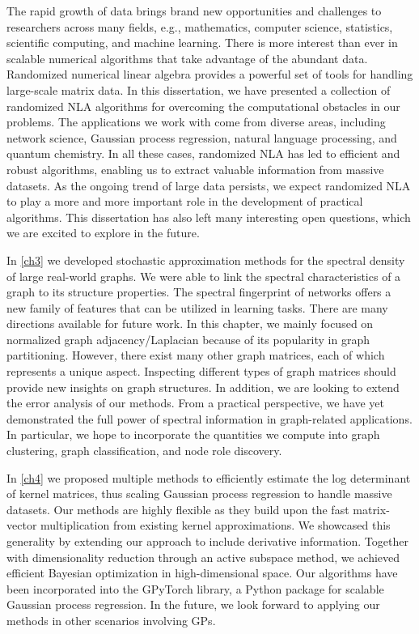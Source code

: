 The rapid growth of data brings brand new opportunities and challenges
to researchers across many fields, e.g., mathematics, computer science,
statistics, scientific computing, and machine learning. There is more interest
than ever in scalable numerical algorithms that take advantage of the abundant
data. Randomized numerical linear algebra provides a powerful
set of tools for handling large\hyp{}scale matrix data. In this dissertation, we
have presented a collection of randomized NLA algorithms for overcoming the
computational obstacles in our problems. The applications we work with come from
diverse areas, including network science, Gaussian process regression, natural
language processing, and quantum chemistry. In all these cases, randomized NLA
has led to efficient and robust algorithms, enabling us to extract valuable
information from massive datasets. As the ongoing trend of large data persists,
we expect randomized NLA to play a more and more important role in the
development of practical algorithms. This dissertation has also left many
interesting open questions, which we are excited to explore in the future.

In \cref{ch3} we developed stochastic approximation methods for the spectral
density of large real\hyp{}world graphs. We were able to link the spectral
characteristics of a graph to its structure properties. The spectral
fingerprint of networks offers a new family of features that can be utilized in
learning tasks. There are many directions available for future work. In this
chapter, we mainly focused on normalized graph adjacency/Laplacian because of
its popularity in graph partitioning. However, there exist many other graph
matrices, each of which represents a unique aspect. Inspecting different types
of graph matrices should provide new insights on graph structures. In addition,
we are looking to extend the error analysis of our methods. From a practical
perspective, we have yet demonstrated the full power of spectral information in
graph\hyp{}related applications. In particular, we hope to incorporate the
quantities we compute into graph clustering, graph classification, and node role
discovery.

In \cref{ch4} we proposed multiple methods to efficiently estimate the log
determinant of kernel matrices, thus scaling Gaussian process regression to
handle massive datasets. Our methods are highly flexible as they build upon the
fast matrix\hyp{}vector multiplication from existing kernel approximations. We
showcased this generality by extending our approach to include derivative
information. Together with dimensionality reduction through an active subspace
method, we achieved efficient Bayesian optimization in high\hyp{}dimensional
space. Our algorithms have been incorporated into the GPyTorch library, a Python
package for scalable Gaussian process regression. In the future, we look
forward to applying our methods in other scenarios involving GPs.

